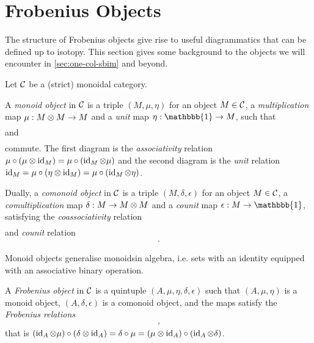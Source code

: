 \section{Frobenius Objects}
\label{sec:frob-object}

The structure of Frobenius objects give rise to useful diagrammatics that can be defined up to isotopy. This section gives some background to the objects we will encounter in \autoref{sec:one-col-sbim} and beyond.

Let $\mathcal{C}$ be a (strict) monoidal category.

\begin{definition}
    A \textit{monoid object} in $\mathcal{C}$ is a triple $(M,\mu,\eta)$ for an object $M \in \mathcal{C}$, a \textit{multiplication} map $\mu: M \otimes M \to M$ and a \textit{unit} map $\eta: \mathbbb{1} \to M$, such that
    \begin{gather*}
        
    \end{gather*}
    and
    \begin{gather*}
        
    \end{gather*}
    commute. The first diagram is the \textit{associativity} relation $\mu \circ (\mu \otimes \operatorname{id}_M) = \mu \circ (\operatorname{id}_M \otimes \mu)$ and the second diagram is the \textit{unit} relation $\operatorname{id}_M = \mu \circ (\eta \otimes \operatorname{id}_M) = \mu \circ (\operatorname{id}_M \otimes \eta)$.

    Dually, a \textit{comonoid object} in $\mathcal{C}$ is a triple $(M,\delta,\epsilon)$ for an object $M \in \mathcal{C}$, a \textit{comultiplication} map $\delta: M \to M \otimes M$ and a \textit{counit} map $\epsilon: M \to \mathbbb{1}$, satisfying the \textit{coassociativity} relation
    \begin{gather*}
        
    \end{gather*}
    and \textit{counit} relation
    \begin{gather*}
        .
    \end{gather*}
\end{definition}

Monoid objects generalise monoidsin algebra, i.e. sets with an identity equipped with an associative binary operation.

\begin{definition}
    A \textit{Frobenius object} in $\mathcal{C}$ is a quintuple $(A,\mu,\eta,\delta,\epsilon)$ such that $(A,\mu,\eta)$ is a monoid object, $(A,\delta,\epsilon)$ is a comonoid object, and the maps satisfy the \textit{Frobenius relations}
    \begin{gather*}
        ,
    \end{gather*}
    that is $(\operatorname{id}_A \otimes \mu) \circ (\delta \otimes \operatorname{id}_A) = \delta \circ \mu = (\mu \otimes \operatorname{id}_A) \circ (\operatorname{id}_A \otimes \delta)$.
\end{definition}


